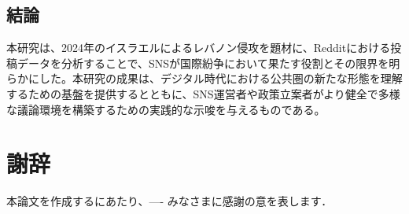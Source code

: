 \documentclass[11pt, a4j]{jreport}
\begin{document}
    \section{結論}
    本研究は、2024年のイスラエルによるレバノン侵攻を題材に、Redditにおける投稿データを分析することで、SNSが国際紛争において果たす役割とその限界を明らかにした。本研究の成果は、デジタル時代における公共圏の新たな形態を理解するための基盤を提供するとともに、SNS運営者や政策立案者がより健全で多様な議論環境を構築するための実践的な示唆を与えるものである。


    \chapter*{謝辞} %
    本論文を作成するにあたり、---- みなさまに感謝の意を表します．


    \renewcommand{\bibname}{参考文献} %
\end{document}
